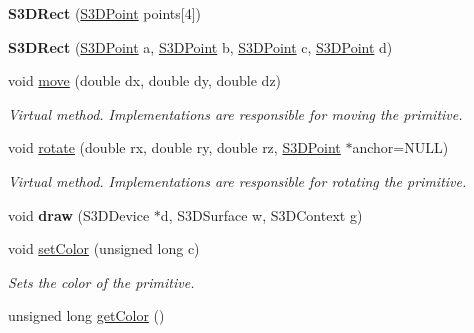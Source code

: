 \begin{DoxyCompactItemize}
\item 
\hypertarget{class_s3_d_rect_a30160c448c675829ced3c254a01ccb6e}{
{\bfseries S3DRect} (\hyperlink{class_s3_d_point}{S3DPoint} points\mbox{[}4\mbox{]})}
\label{class_s3_d_rect_a30160c448c675829ced3c254a01ccb6e}

\item 
\hypertarget{class_s3_d_rect_adfec4ab2501bd4cfef0f5fd82d769942}{
{\bfseries S3DRect} (\hyperlink{class_s3_d_point}{S3DPoint} a, \hyperlink{class_s3_d_point}{S3DPoint} b, \hyperlink{class_s3_d_point}{S3DPoint} c, \hyperlink{class_s3_d_point}{S3DPoint} d)}
\label{class_s3_d_rect_adfec4ab2501bd4cfef0f5fd82d769942}

\item 
\hypertarget{class_s3_d_rect_a97fcf9a2380d07c59bc12db8bd5949bc}{
void \hyperlink{class_s3_d_rect_a97fcf9a2380d07c59bc12db8bd5949bc}{move} (double dx, double dy, double dz)}
\label{class_s3_d_rect_a97fcf9a2380d07c59bc12db8bd5949bc}

\begin{DoxyCompactList}\small\item\em Virtual method. Implementations are responsible for moving the primitive. \item\end{DoxyCompactList}\item 
\hypertarget{class_s3_d_rect_a1d3b8406b588abf19cff5f8a6d6de2e2}{
void \hyperlink{class_s3_d_rect_a1d3b8406b588abf19cff5f8a6d6de2e2}{rotate} (double rx, double ry, double rz, \hyperlink{class_s3_d_point}{S3DPoint} $\ast$anchor=NULL)}
\label{class_s3_d_rect_a1d3b8406b588abf19cff5f8a6d6de2e2}

\begin{DoxyCompactList}\small\item\em Virtual method. Implementations are responsible for rotating the primitive. \item\end{DoxyCompactList}\item 
\hypertarget{class_s3_d_rect_adfa6596cc2a62c83709f0f3a040333c1}{
void {\bfseries draw} (S3DDevice $\ast$d, S3DSurface w, S3DContext g)}
\label{class_s3_d_rect_adfa6596cc2a62c83709f0f3a040333c1}

\item 
void \hyperlink{class_s3_d_rect_af1a976fbe476e7096b2ceded7ab1659c}{setColor} (unsigned long c)
\begin{DoxyCompactList}\small\item\em Sets the color of the primitive. \item\end{DoxyCompactList}\item 
\hypertarget{class_s3_d_rect_adbf17caac29e632afb9f380e3821a256}{
unsigned long \hyperlink{class_s3_d_rect_adbf17caac29e632afb9f380e3821a256}{getColor} ()}
\label{class_s3_d_rect_adbf17caac29e632afb9f380e3821a256}


\end{DoxyCompactItemize}
